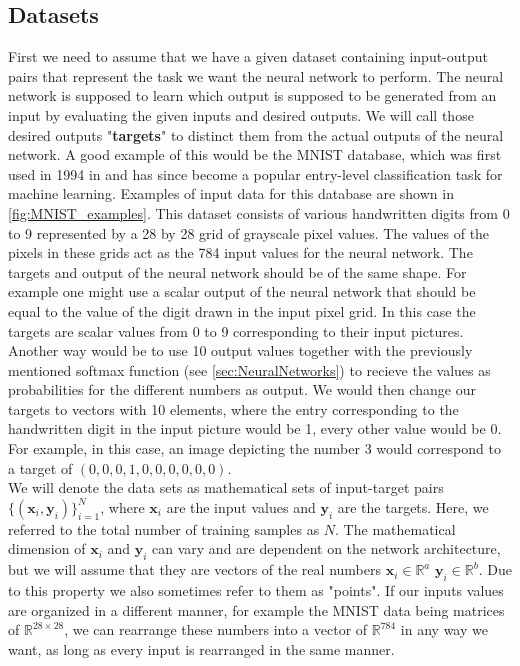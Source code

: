 \subsection{Datasets}\label{sec:Datasets}
First we need to assume that we have a given dataset containing input-output pairs that represent the task we want the neural network to perform. The neural network is supposed to learn which output is supposed to be generated from an input by evaluating the given inputs and desired outputs. We will call those desired outputs "\textbf{targets}" to distinct them from the actual outputs of the neural network. A good example of this would be the MNIST database, which was first used in 1994 in \cite{firstMNISTpaper} and has since become a popular entry-level classification task for machine learning. Examples of input data for this database are shown in \cref{fig:MNIST_examples}. 
This dataset consists of various handwritten digits from 0 to 9 represented by a 28 by 28 grid of grayscale pixel values. The values of the pixels in these grids act as the 784 input values for the neural network. The targets and output of the neural network should be of the same shape. For example one might use a scalar output of the neural network that should be equal to the value of the digit drawn in the input pixel grid. In this case the targets are scalar values from 0 to 9 corresponding to their input pictures. Another way would be to use 10 output values together with the previously mentioned softmax function (see \cref{sec:NeuralNetworks}) to recieve the values as probabilities for the different numbers as output. We would then change our targets to vectors with 10 elements, where the entry corresponding to the handwritten digit in the input picture would be 1, every other value would be 0. For example, in this case, an image depicting the number 3 would correspond to a target of $(0,0,0,1,0,0,0,0,0,0)$.\\
We will denote the data sets as mathematical sets of input-target pairs $\{(\mathbf{x}_i, \mathbf{y}_i)\}_{i=1}^N$, where $\mathbf{x}_i$ are the input values and $\mathbf{y}_i$ are the targets. Here, we referred to the total number of training samples as $N$. The mathematical dimension of $\mathbf{x}_i$ and $\mathbf{y}_i$ can vary and are dependent on the network architecture, but we will assume that they are vectors of the real numbers $\mathbf{x}_i \in \mathbb{R}^a$ $\mathbf{y}_i \in \mathbb{R}^b$. Due to this property we also sometimes refer to them as "points". If our inputs values are organized in a different manner, for example the MNIST data being matrices of $\mathbb{R}^{28\times28}$, we can rearrange these numbers into a vector of $\mathbb{R}^{784}$ in any way we want, as long as every input is rearranged in the same manner.\\
